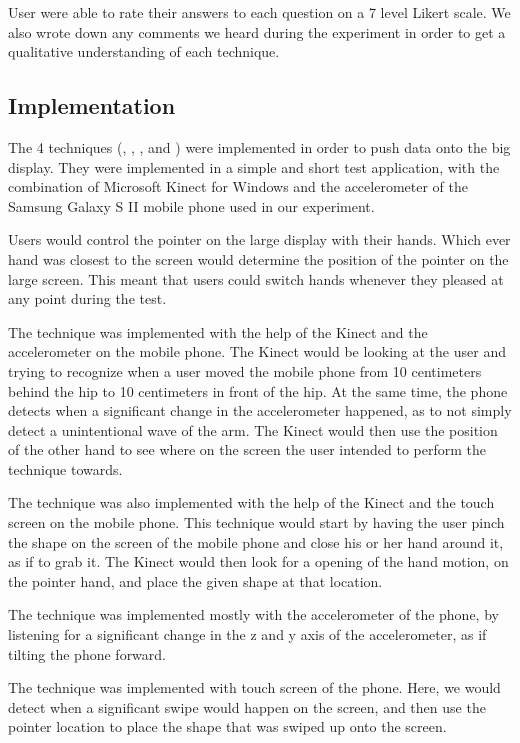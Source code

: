 User were able to rate their answers to each question on a 7 level Likert scale. 
We also wrote down any comments we heard during the experiment in order to get a qualitative understanding of each technique.  

\subsection{Implementation}

The 4 techniques (\swipe, \tilt, \throw, and \pinch) were implemented in order to push data onto the big display. They were implemented in a simple and short test application, with the combination of Microsoft Kinect for Windows and the accelerometer of the Samsung Galaxy S II mobile phone used in our experiment. 

Users would control the pointer on the large display with their hands. 
Which ever hand was closest to the screen would determine the position of the pointer on the large screen. 
This meant that users could switch hands whenever they pleased at any point during the test. 

The \throw technique was implemented with the help of the Kinect and the accelerometer on the mobile phone. 
The Kinect would be looking at the user and trying to recognize when a user moved the mobile phone from 10 centimeters behind the hip to 10 centimeters in front of the hip. 
At the same time, the phone detects when a significant change in the accelerometer happened, as to not simply detect a unintentional wave of the arm. 
The Kinect would then use the position of the other hand to see where on the screen the user intended to perform the \throw technique towards. 

The \pinch technique was also implemented with the help of the Kinect and the touch screen on the mobile phone. 
This technique would start by having the user pinch the shape on the screen of the mobile phone and close his or her hand around it, as if to grab it. 
The Kinect would then look for a opening of the hand motion, on the pointer hand, and place the given shape at that location. 

The \tilt technique was implemented mostly with the accelerometer of the phone, by listening for a significant change in the z and y axis of the accelerometer, as if tilting the phone forward. 

The \swipe technique was implemented with touch screen of the phone. 
Here, we would detect when a significant swipe would happen on the screen, and then use the pointer location to place the shape that was swiped up onto the screen. 

